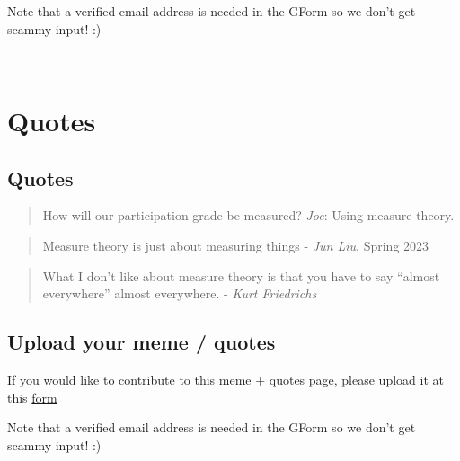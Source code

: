 \documentclass[
  letterpaper,
  DIV=11,
  numbers=noendperiod]{scrreprt}
\theoremstyle{plain}
\theoremstyle{definition}
\theoremstyle{remark}
\begin{document}
Note that a verified email address is needed in the GForm so we don't
get scammy input! :)

\(\,\)


\hypertarget{quotes}{%
\chapter*{Quotes}\label{quotes}}


\hypertarget{quotes-1}{%
\section*{Quotes}\label{quotes-1}}


\begin{quote}
How will our participation grade be measured? \emph{Joe}: Using measure
theory.
\end{quote}

\begin{quote}
Measure theory is just about measuring things - \emph{Jun Liu}, Spring
2023
\end{quote}

\begin{quote}
What I don't like about measure theory is that you have to say ``almost
everywhere'' almost everywhere. - \emph{Kurt Friedrichs}
\end{quote}

\hypertarget{upload-your-meme-quotes}{%
\section*{Upload your meme / quotes}\label{upload-your-meme-quotes}}


If you would like to contribute to this meme + quotes page, please
upload it at this \href{https://forms.gle/RBmMNYJp4u3qD5W79}{form}

Note that a verified email address is needed in the GForm so we don't
get scammy input! :)

\(\,\)
\end{document}
